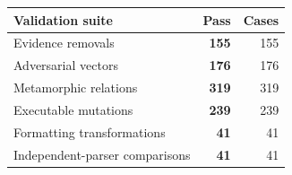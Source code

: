 \begin{tabular}{lrr}
\toprule
Validation suite & Pass & Cases \\
\midrule
Evidence removals & \textbf{155} & 155 \\
Adversarial vectors & \textbf{176} & 176 \\
Metamorphic relations & \textbf{319} & 319 \\
Executable mutations & \textbf{239} & 239 \\
Formatting transformations & \textbf{41} & 41 \\
Independent-parser comparisons & \textbf{41} & 41 \\
\bottomrule
\end{tabular}
